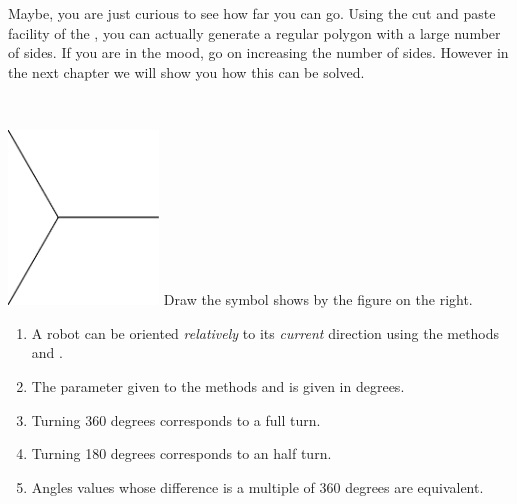 Maybe, you are just curious to see how far you can go. Using the
cut and paste facility of the \tw, you can
actually generate a regular polygon with a large number of sides.
If you are in the mood, go on increasing the number of sides. However
in the next chapter we will show you how this can be solved. 

\ 


\begin{exofigwithsize}{\includegraphics[width=4cm]{ChTurnc3pace}}\label{exo:pace}
Draw the symbol shows by the figure on the  right.
\end{exofigwithsize}





\summa
\begin{enumerate}
\item A robot can be oriented \emph{relatively} to its \emph{current}
  direction using the methods \turnLeft and \turnRight.
\item The parameter given to the methods  \turnLeft and
\turnRight is given in degrees.
  \item Turning 360 degrees corresponds to a full turn.
	\item Turning  180 degrees corresponds to an half turn.
  \item Angles values whose difference is a multiple of 360 degrees
  are equivalent.
\end{enumerate}


